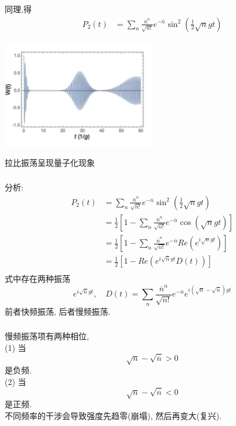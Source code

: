     \begin{frame} 
    \frametitle{}
         同理,得
         \[\begin{aligned}
            P_2(t) &= \sum_n  \frac{\overline{n}^n}{\sqrt{n!}} e^{-\overline{n}} \sin ^2 (\frac{1}{2} \sqrt{n} g t) 
   \end{aligned} \]
      \begin{center}
           \includegraphics[width=0.5\textwidth]{figs/2022-05-22-21-56-35.png}
      \end{center}
      拉比振荡呈现量子化现象
    \end{frame}

\begin{frame} 
\frametitle{}
    分析:
\[\begin{aligned}
    P_2(t) &= \sum_n  \frac{\overline{n} ^n}{\sqrt{n!}} e^{-\overline{n}} \sin ^2 (\frac{1}{2} \sqrt{n} g t) \\ 
    &= \frac{1}{2} \left[ 1 - \sum_n  \frac{\overline{n}^n}{\sqrt{n!}} e^{-\overline{n}} \cos (\sqrt{n} g t) \right] \\ 
    &= \frac{1}{2} \left[ 1 - \sum_n  \frac{\overline{n}^n}{\sqrt{n!}} e^{-\overline{n}} Re(e^{i\sqrt{n} g t}) \right] \\ 
    &= \frac{1}{2} \left[ 1 - Re(e^{i\sqrt{\overline{n}} g t} D(t)) \right] \\ 
\end{aligned} \] 
式中存在两种振荡
\[ e^{i\sqrt{\overline{n}} g t}, \quad D(t) =  \sum_n  \frac{\overline{n}^n}{\sqrt{n!}} e^{-\overline{n}} e^{i(\sqrt{n}-\sqrt{\overline{n}}) g t}\]
前者快频振荡, 后者慢频振荡. 
\end{frame}

\begin{frame} 
\frametitle{}
慢频振荡项有两种相位, \\ 
     (1) 当 
     \[\sqrt{n}-\sqrt{\overline{n}}> 0\]
    是负频. \\ 
    (2) 当 
    \[\sqrt{n}-\sqrt{\overline{n}}< 0\]
    是正频.\\ 
   不同频率的干涉会导致强度先趋零(崩塌), 然后再变大(复兴).
\end{frame}

